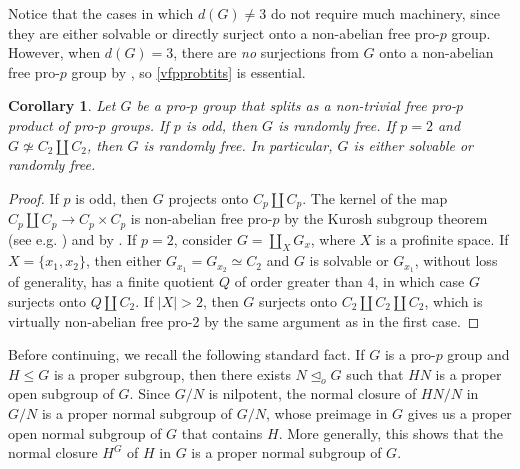 \documentclass[a4paper,10pt]{amsart}
\theoremstyle{plain}
\newtheorem{corollary}[thm]{Corollary}
\theoremstyle{definition}
\numberwithin{equation}{section}
\begin{document}
Notice that the cases in which $d(G) \neq 3$ do not require much machinery, since they are either solvable or directly surject onto a non-abelian free pro-$p$ group. However, when $d(G)=3$, there are \emph{no} surjections from $G$ onto a non-abelian free pro-$p$ group by \cite{S74}, so \cref{vfpprobtits} is essential.

\begin{corollary}\label{freeprod}
    Let $G$ be a pro-$p$ group that splits as a non-trivial free pro-$p$ product of pro-$p$ groups. If $p$ is odd, then $G$ is randomly free. If $p=2$ and $G\not\simeq C_2\amalg C_2$, then $G$ is randomly free. In particular, $G$ is either solvable or randomly free.
\end{corollary}
\begin{proof}
    If $p$ is odd, then $G$ projects onto $C_p \amalg C_p$. The kernel of the map $C_p \amalg C_p \to C_p \times C_p$ is non-abelian free pro-$p$ by the Kurosh subgroup theorem (see e.g. \cite[Theorem 7.3.1]{R17}) and by \cite[Corollary 7.1.8]{R17}. If $p=2$, consider $G = \amalg_X G_x$, where $X$ is a profinite space. If $X=\{x_1,x_2\}$, then either $G_{x_1} = G_{x_2} \simeq C_2$ and $G$ is solvable or $G_{x_1}$, without loss of generality, has a finite quotient $Q$ of order greater than 4, in which case $G$ surjects onto $Q \amalg C_2$. If $|X| > 2$, then $G$ surjects onto $C_2 \amalg C_2 \amalg C_2$, which is virtually non-abelian free pro-2 by the same argument as in the first case.
\end{proof}

Before continuing, we recall the following standard fact. If $G$ is a pro-$p$ group and $H \leq G$ is a proper subgroup, then there exists $N\unlhd_o G$ such that $HN$ is a proper open subgroup of $G$. Since $G/N$ is nilpotent, the normal closure of $HN/N$ in $G/N$ is a proper normal subgroup of $G/N$, whose preimage in $G$ gives us a proper open normal subgroup of $G$ that contains $H$. More generally, this shows that the normal closure $H^G$ of $H$ in $G$ is a proper normal subgroup of $G$.
\end{document}
